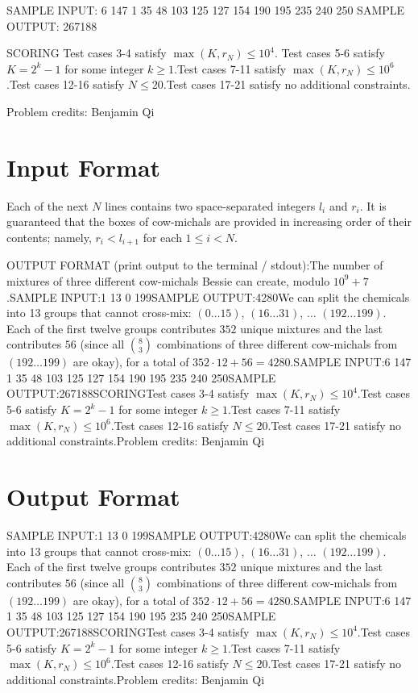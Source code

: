 \documentclass[12pt]{article}
\begin{document}
SAMPLE INPUT:
6 147
1 35
48 103
125 127
154 190
195 235
240 250
SAMPLE OUTPUT: 
267188

SCORING
Test cases 3-4 satisfy $\max(K,r_N)\le 10^4$. Test cases 5-6 satisfy $K=2^k-1$ for some integer $k\ge 1$.Test cases 7-11 satisfy $\max(K,r_N)\le 10^6$.Test cases 12-16 satisfy $N\le 20$.Test cases 17-21 satisfy no additional constraints.


Problem credits: Benjamin Qi



\section*{Input Format}
Each of the next $N$ lines contains two space-separated integers $l_i$ and
$r_i$. It is guaranteed that the boxes of cow-michals are provided in increasing
order of their contents; namely, $r_i<l_{i+1}$ for each $1\le i<N$.

OUTPUT FORMAT (print output to the terminal / stdout):The number of mixtures of three different cow-michals Bessie can create, modulo
$10^9 + 7$.SAMPLE INPUT:1 13
0 199SAMPLE OUTPUT:4280We can split the chemicals into 13 groups that cannot cross-mix: $(0\ldots 15)$,
$(16\ldots 31)$,  $\ldots$ $(192\ldots 199)$. Each of the first twelve groups
contributes $352$ unique mixtures and the last contributes $56$ (since all
$\binom{8}{3}$ combinations of three different cow-michals from
$(192\ldots 199)$ are okay), for a total of
$352\cdot 12+56=4280$.SAMPLE INPUT:6 147
1 35
48 103
125 127
154 190
195 235
240 250SAMPLE OUTPUT:267188SCORINGTest cases 3-4 satisfy $\max(K,r_N)\le 10^4$.Test cases 5-6 satisfy $K=2^k-1$ for some integer $k\ge 1$.Test cases 7-11 satisfy $\max(K,r_N)\le 10^6$.Test cases 12-16 satisfy $N\le 20$.Test cases 17-21 satisfy no additional constraints.Problem credits: Benjamin Qi

\section*{Output Format}
SAMPLE INPUT:1 13
0 199SAMPLE OUTPUT:4280We can split the chemicals into 13 groups that cannot cross-mix: $(0\ldots 15)$,
$(16\ldots 31)$,  $\ldots$ $(192\ldots 199)$. Each of the first twelve groups
contributes $352$ unique mixtures and the last contributes $56$ (since all
$\binom{8}{3}$ combinations of three different cow-michals from
$(192\ldots 199)$ are okay), for a total of
$352\cdot 12+56=4280$.SAMPLE INPUT:6 147
1 35
48 103
125 127
154 190
195 235
240 250SAMPLE OUTPUT:267188SCORINGTest cases 3-4 satisfy $\max(K,r_N)\le 10^4$.Test cases 5-6 satisfy $K=2^k-1$ for some integer $k\ge 1$.Test cases 7-11 satisfy $\max(K,r_N)\le 10^6$.Test cases 12-16 satisfy $N\le 20$.Test cases 17-21 satisfy no additional constraints.Problem credits: Benjamin Qi
\end{document}
